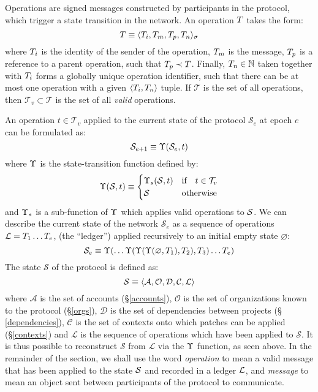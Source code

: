 
Operations are signed messages constructed by participants in the protocol,
which trigger a state transition in the network. An operation $T$ takes
the form:
\[
    T \equiv \langle T_i, T_m, T_p, T_n \rangle_{\sigma}
\]
where $T_i$ is the identity of the sender of the operation, $T_m$ is the
message, $T_p$ is a reference to a parent operation, such that $T_p \prec
T$. Finally, $T_n \in \mathbb{N}$ taken together with $T_i$ forms a
globally unique operation identifier, such that there can be at most one
operation with a given $\langle T_i, T_n \rangle$ tuple. If $\mathcal{T}$ is the
set of all operations, then $\mathcal{T}_v \subset \mathcal{T}$ is the set of all \emph{valid}
operations.

An operation $t \in \mathcal{T}_v$ applied to the current state of the protocol $\mathcal{S}_e$
at epoch $e$ can be formulated as:
\[
    \mathcal{S}_{e+1} \equiv \Upsilon(\mathcal{S}_e, t)
\]
where $\Upsilon$ is the state-transition function defined by:
\[
    \Upsilon(\mathcal{S}, t) \equiv \begin{cases}
        \Upsilon_{s}(\mathcal{S}, t) & \text{if} \quad t \in \mathcal{T}_v \\
        \mathcal{S}                & \text{otherwise}
    \end{cases}
\]
and $\Upsilon_s$ is a sub-function of $\Upsilon$ which applies valid operations to
$\mathcal{S}$.  We can describe the current
state of the network $\mathcal{S}_e$ as a sequence of operations $\mathcal{L} =
T_1 \dotso T_e$, (the ``ledger'') applied recursively to an initial empty
state $\varnothing$:
\[
    \mathcal{S}_e \equiv \Upsilon(\dotso \Upsilon(\Upsilon(\Upsilon(\varnothing,
    T_1), T_2), T_3) \dotso T_e)
\]
The state $\mathcal{S}$ of the protocol is defined as:
\[
    \mathcal{S} \equiv \langle \mathcal{A}, \mathcal{O}, \mathcal{D}, \mathcal{C}, \mathcal{L} \rangle \\
\]
where $\mathcal{A}$ is the set of accounts (\S \ref{accounts}), $\mathcal{O}$
is the set of organizations known to the protocol (\S \ref{orgs}),
$\mathcal{D}$ is the set of dependencies between projects (\S
\ref{dependencies}), $\mathcal{C}$ is the set of contexts onto which patches
can be applied (\S \ref{contexts}) and $\mathcal{L}$ is the sequence of
operations which have been applied to $\mathcal{S}$. It is thus possible to
reconstruct $\mathcal{S}$ from $\mathcal{L}$ via the $\Upsilon$ function, as
seen above. In the remainder of the section, we shall use the word
\emph{operation} to mean a valid message that has been applied to the state
$\mathcal{S}$ and recorded in a ledger $\mathcal{L}$, and \emph{message} to mean an
object sent between participants of the protocol to communicate.

